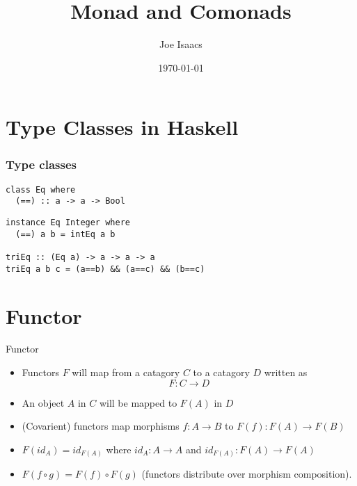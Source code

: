 \documentclass{beamer} %
\author{Joe Isaacs}
\title{Monad and Comonads}
\institute{Churchill CompSci talks}
\date{\today}
\begin{document}
\begin{frame}
  \titlepage
\end{frame}

\section{Type Classes in Haskell}

\begin{frame}[fragile]\frametitle{Type classes}
\begin{verbatim}
class Eq where
  (==) :: a -> a -> Bool
\end{verbatim}

\begin{verbatim}
instance Eq Integer where
  (==) a b = intEq a b

triEq :: (Eq a) -> a -> a -> a
triEq a b c = (a==b) && (a==c) && (b==c)
\end{verbatim}
\end{frame}

\section{Functor}

\begin{frame}{Functor}
  \begin{itemize}
    \item Functors $F$ will map from a catagory $C$ to a catagory $D$ written as 
      \[ F : C \rightarrow D \]

    \item An object $A$ in $C$ will be mapped to $F(A)$ in $D$

    \item (Covarient) functors map morphisms $f : A \rightarrow B$ to $F(f) : F(A) \rightarrow F(B)$

    \item $F(id_A) = id_{F(A)}$ where $id_A : A \rightarrow A$ and 
      $id_{F(A)} : F(A) \rightarrow F(A)$

    \item $F(f \circ g) = F(f) \circ F(g) $ (functors distribute over morphism composition).
  \end{itemize}
\end{frame}
\end{document}
